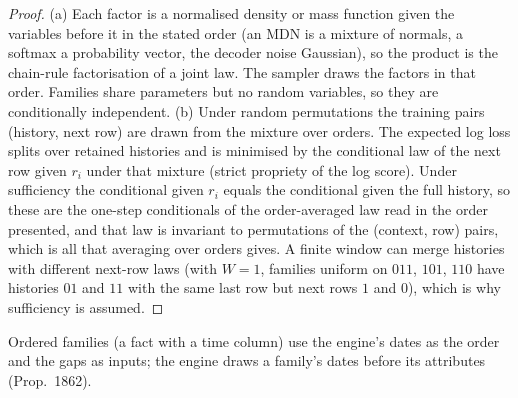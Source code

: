 \begin{proof}
(a) Each factor is a normalised density or mass function given the variables before it in the stated order (an MDN is a mixture of normals, a softmax a probability vector, the decoder noise Gaussian), so the product is the chain-rule factorisation of a joint law. The sampler draws the factors in that order. Families share parameters but no random variables, so they are conditionally independent. (b) Under random permutations the training pairs (history, next row) are drawn from the mixture over orders. The expected log loss splits over retained histories and is minimised by the conditional law of the next row given $r_i$ under that mixture (strict propriety of the log score). Under sufficiency the conditional given $r_i$ equals the conditional given the full history, so these are the one-step conditionals of the order-averaged law read in the order presented, and that law is invariant to permutations of the (context, row) pairs, which is all that averaging over orders gives. A finite window can merge histories with different next-row laws (with $W=1$, families uniform on $011$, $101$, $110$ have histories $01$ and $11$ with the same last row but next rows $1$ and $0$), which is why sufficiency is assumed.
\end{proof}
\noindent Ordered families (a fact with a time column) use the engine's dates as the order and the gaps as inputs; the engine draws a family's dates before its attributes (Prop.~1862).

